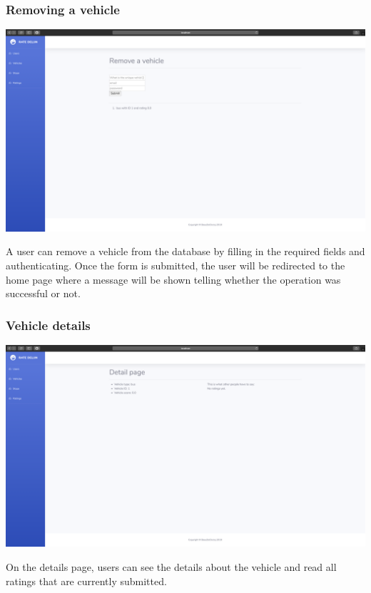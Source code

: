 \documentclass[12pt]{article}
\begin{document}
\subsubsection{Removing a vehicle}
\begin{center}
	\includegraphics[width=\linewidth]{Images/Remove_vehicle.png}
\end{center}
A user can remove a vehicle from the database by filling in the required fields and authenticating. Once the form is submitted, the user will be redirected to the home page where a message will be shown telling whether the operation was successful or not.\\

\subsubsection{Vehicle details}
\begin{center}
	\includegraphics[width=\linewidth]{Images/Vehicle_details.png}
\end{center}
On the details page, users can see the details about the vehicle and read all ratings that are currently submitted.
\end{document}
